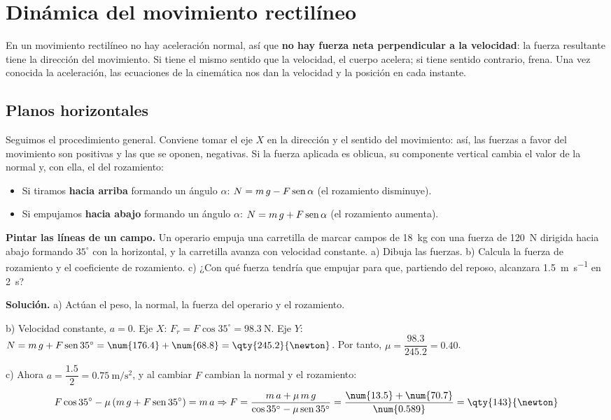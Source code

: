 \section{Dinámica del movimiento rectilíneo}\label{sec:ud11-rectilineo}

En un movimiento rectilíneo no hay aceleración normal, así que \textbf{no hay fuerza neta perpendicular a la velocidad}: la fuerza
resultante tiene la dirección del movimiento. Si tiene el mismo sentido que la velocidad, el cuerpo acelera; si tiene sentido
contrario, frena. Una vez conocida la aceleración, las ecuaciones de la cinemática nos dan la velocidad y la posición en cada instante.

\subsection{Planos horizontales}

Seguimos el procedimiento general. Conviene tomar el eje \(X\) en la dirección y el sentido del movimiento: así, las fuerzas a favor del
movimiento son positivas y las que se oponen, negativas. Si la fuerza aplicada es oblicua, su componente vertical cambia el valor de la
normal y, con ella, el del rozamiento:
\begin{itemize}
    \item Si tiramos \textbf{hacia arriba} formando un ángulo \(\alpha\): \(N = m\,g - F\operatorname{sen}\alpha\) (el rozamiento disminuye).
    \item Si empujamos \textbf{hacia abajo} formando un ángulo \(\alpha\): \(N = m\,g + F\operatorname{sen}\alpha\) (el rozamiento aumenta).
\end{itemize}

\begin{example}
    \textbf{Pintar las líneas de un campo.} Un operario empuja una carretilla de marcar campos de \qty{18}{\kg} con una fuerza de
    \qty{120}{\newton} dirigida hacia abajo formando \(35^\circ\) con la horizontal, y la carretilla avanza con velocidad constante.
    a) Dibuja las fuerzas. b) Calcula la fuerza de rozamiento y el coeficiente de rozamiento. c) ¿Con qué fuerza tendría que empujar
    para que, partiendo del reposo, alcanzara \qty{1.5}{\m\per\s} en \qty{2}{\s}?

    \textbf{Solución.} a) Actúan el peso, la normal, la fuerza del operario y el rozamiento.

    b) Velocidad constante, \(a = 0\). Eje \(X\): \(F_r = F\cos 35^\circ = \qty{98.3}{\newton}\). Eje \(Y\):
    \(N = m\,g + F\sen 35^\circ = \num{176.4} + \num{68.8} = \qty{245.2}{\newton}\). Por tanto, \(\mu = \dfrac{\num{98.3}}{\num{245.2}} = \num{0.40}\).

    c) Ahora \(a = \dfrac{\num{1.5}}{2} = \qty{0.75}{\m\per\s\squared}\), y al cambiar \(F\) cambian la normal y el rozamiento:
    \[ F\cos 35^\circ - \mu\,(m\,g + F\sen 35^\circ) = m\,a \Rightarrow F = \frac{m\,a + \mu\,m\,g}{\cos 35^\circ - \mu\sen 35^\circ}
    = \frac{\num{13.5} + \num{70.7}}{\num{0.589}} = \qty{143}{\newton} \]
\end{example}


